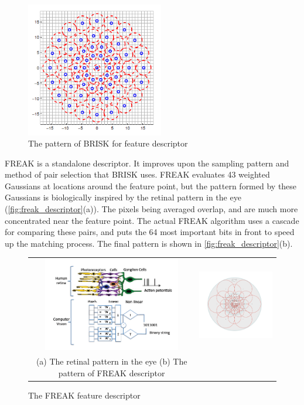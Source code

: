 \begin{figure}[H]
  \centering
  \includegraphics[width=60mm]{figures/brisk_descriptor}
  \caption{The pattern of BRISK for feature descriptor}\label{fig:brisk_descriptor}
\end{figure}

FREAK is a standalone descriptor. It improves upon the sampling pattern and method of pair selection that BRISK uses. FREAK evaluates 43 weighted Gaussians at locations around the feature point, but the pattern formed by these Gaussians is biologically inspired by the retinal pattern in the eye (\autoref{fig:freak_descriptor}(a)). The pixels being averaged overlap, and are much more concentrated near the feature point. The actual FREAK algorithm uses a cascade for comparing these pairs, and puts the 64 most important bits in front to speed up the matching process. The final pattern is shown in 
\autoref{fig:freak_descriptor}(b).

\begin{figure}[H]
\begin{tabular}{cc}
  \includegraphics[width=60mm]{figures/freak_retina} &  \includegraphics[width=60mm]{figures/freak_descriptor} \\
(a) The retinal pattern in the eye (b) The pattern of FREAK descriptor \\[6pt]
\end{tabular}
\caption{The FREAK feature descriptor} \label{fig:freak_descriptor}
\end{figure}


